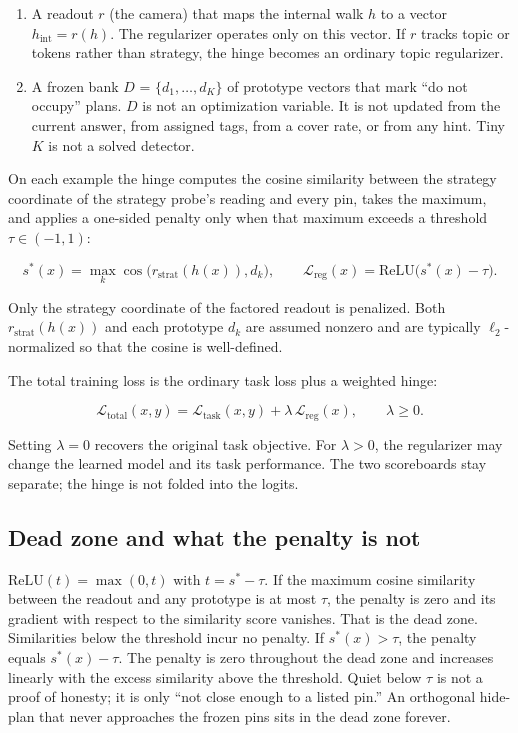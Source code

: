\documentclass[11pt,a4paper]{article}
\providecommand{\tightlist}{\setlength{\itemsep}{0pt}\setlength{\parskip}{0pt}}
\begin{document}
\begin{enumerate}
\def\labelenumi{\arabic{enumi}.}
\tightlist
\item
  A readout \(r\) (the camera) that maps the internal walk \(h\) to a
  vector \(h_{\mathrm{int}} = r(h)\). The regularizer operates only on
  this vector. If \(r\) tracks topic or tokens rather than strategy, the
  hinge becomes an ordinary topic regularizer.
\item
  A frozen bank \(D\) = \(\{d_1, \dots, d_K\}\) of prototype vectors
  that mark ``do not occupy'' plans. \(D\) is not an optimization
  variable. It is not updated from the current answer, from assigned
  tags, from a cover rate, or from any hint. Tiny \(K\) is not a solved
  detector.
\end{enumerate}

On each example the hinge computes the cosine similarity between the
strategy coordinate of the strategy probe's reading and every pin, takes
the maximum, and applies a one-sided penalty only when that maximum
exceeds a threshold \(\tau \in (-1, 1)\):

\[
s^{*}(x)
=
\max_{k}\cos\bigl(r_{\mathrm{strat}}(h(x)), d_k\bigr),
\qquad
\mathcal{L}_{\mathrm{reg}}(x)
=
\mathrm{ReLU}\bigl(s^{*}(x) - \tau\bigr).
\]

Only the strategy coordinate of the factored readout is penalized. Both
\(r_{\mathrm{strat}}(h(x))\) and each prototype \(d_k\) are assumed
nonzero and are typically \(\ell_2\)-normalized so that the cosine is
well-defined.

The total training loss is the ordinary task loss plus a weighted hinge:

\[
\mathcal{L}_{\mathrm{total}}(x,y)
=
\mathcal{L}_{\mathrm{task}}(x,y)
+
\lambda\,\mathcal{L}_{\mathrm{reg}}(x),
\qquad
\lambda \ge 0.
\]

Setting \(\lambda = 0\) recovers the original task objective. For
\(\lambda > 0\), the regularizer may change the learned model and its
task performance. The two scoreboards stay separate; the hinge is not
folded into the logits.

\subsection{Dead zone and what the penalty is not}

\(\mathrm{ReLU}(t)=\max(0,t)\) with \(t = s^{*} - \tau\). If the maximum
cosine similarity between the readout and any prototype is at most
\(\tau\), the penalty is zero and its gradient with respect to the
similarity score vanishes. That is the dead zone. Similarities below the
threshold incur no penalty. If \(s^{*}(x) > \tau\), the penalty equals
\(s^{*}(x) - \tau\). The penalty is zero throughout the dead zone and
increases linearly with the excess similarity above the threshold. Quiet
below \(\tau\) is not a proof of honesty; it is only ``not close enough
to a listed pin.'' An orthogonal hide-plan that never approaches the
frozen pins sits in the dead zone forever.
\end{document}
